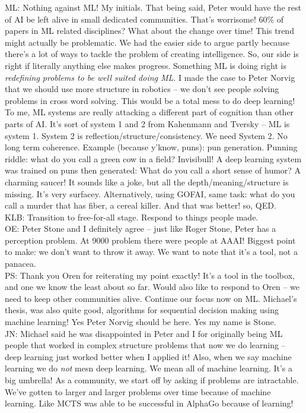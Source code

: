 ML: Nothing against ML! My initials. That being said, Peter would have the rest of AI be left alive in small dedicated communities. That's worrisome! 60\% of papers in ML related disciplines? What about the change over time! This trend might actually be problematic. We had the easier side to argue partly because there's a lot of ways to tackle the problem of creating intelligence. So, our side is right if literally anything else makes progress. Something ML is doing right is {\it redefining problems to be well suited doing ML}. I made the case to Peter Norvig that we should use more structure in robotics -- we don't see people solving problems in cross word solving. This would be a total mess to do deep learning! To me, ML systems are really attacking a different part of cognition than other parts of AI. It's sort of system 1 and 2 from Kahenmann and Tversky -- ML is system 1. System 2 is reflection/structure/consistency. We need System 2. No long term coherence. Example (because y'know, puns): pun generation. Punning riddle: what do you call a green cow in a field? Invisibull! A deep learning system was trained on puns then generated: What do you call a short sense of humor? A charming saucer! It sounds like a joke, but all the depth/meaning/structure is missing. It's very surfacey. Alternatively, using GOFAI, same task: what do you call a murder that has fiber, a cereal killer. And that was better! so, QED. \\

KLB: Transition to free-for-all stage. Respond to things people made. \\

OE: Peter Stone and I definitely agree -- just like Roger Stone, Peter has a perception problem. At 9000 problem there were people at AAAI! Biggest point to make: we don't want to throw it away. We want to note that it's a tool, not a panacea. \\

PS: Thank you Oren for reiterating my point exactly! It's a tool in the toolbox, and one we know the least about so far. Would also like to respond to Oren -- we need to keep other communities alive. Continue our focus now on ML. Michael's thesis, was also quite good, algorithms for sequential decision making using machine learning! Yes Peter Norvig should be here. Yes my name is Stone. \\

JN: Michael said he was disappointed in Peter and I for originally being ML people that worked in complex structure problems that now we do learning -- deep learning just worked better when I applied it! Also, when we say machine learning we do {\it not} mesn deep learning. We mean all of machine learning. It's a big umbrella! As a community, we start off by asking if problems are intractable. We've gotten to larger and larger problems over time because of machine learning. Like MCTS was able to be successful in AlphaGo because of learning! \\

